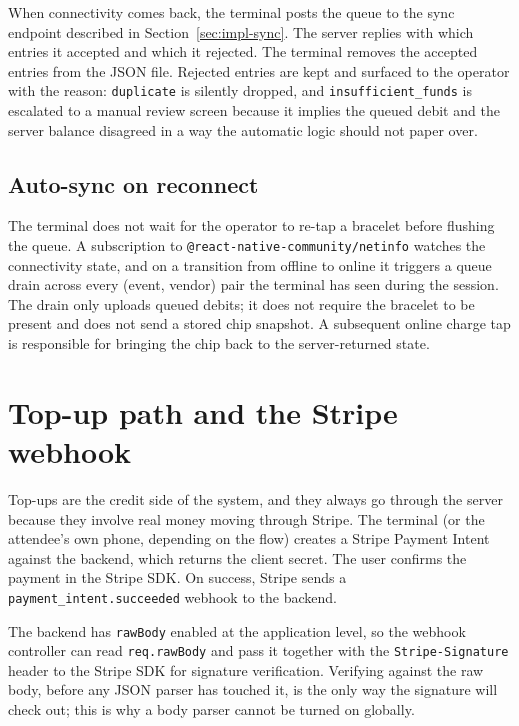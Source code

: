 When connectivity comes back, the terminal posts the queue to the sync endpoint described in Section~\ref{sec:impl-sync}. The server replies with which entries it accepted and which it rejected. The terminal removes the accepted entries from the JSON file. Rejected entries are kept and surfaced to the operator with the reason: \texttt{duplicate} is silently dropped, and \texttt{insufficient\_funds} is escalated to a manual review screen because it implies the queued debit and the server balance disagreed in a way the automatic logic should not paper over.

\subsection{Auto-sync on reconnect}
\label{subsec:impl-autosync}

The terminal does not wait for the operator to re-tap a bracelet before flushing the queue. A subscription to \texttt{@react-native-community/netinfo} watches the connectivity state, and on a transition from offline to online it triggers a queue drain across every (event, vendor) pair the terminal has seen during the session. The drain only uploads queued debits; it does not require the bracelet to be present and does not send a stored chip snapshot. A subsequent online charge tap is responsible for bringing the chip back to the server-returned state.

\section{Top-up path and the Stripe webhook}
\label{sec:impl-topup}

Top-ups are the credit side of the system, and they always go through the server because they involve real money moving through Stripe. The terminal (or the attendee's own phone, depending on the flow) creates a Stripe Payment Intent against the backend, which returns the client secret. The user confirms the payment in the Stripe SDK. On success, Stripe sends a \texttt{payment\_intent.succeeded} webhook to the backend.

The backend has \texttt{rawBody} enabled at the application level, so the webhook controller can read \texttt{req.rawBody} and pass it together with the \texttt{Stripe-Signature} header to the Stripe SDK for signature verification. Verifying against the raw body, before any JSON parser has touched it, is the only way the signature will check out; this is why a body parser cannot be turned on globally.

